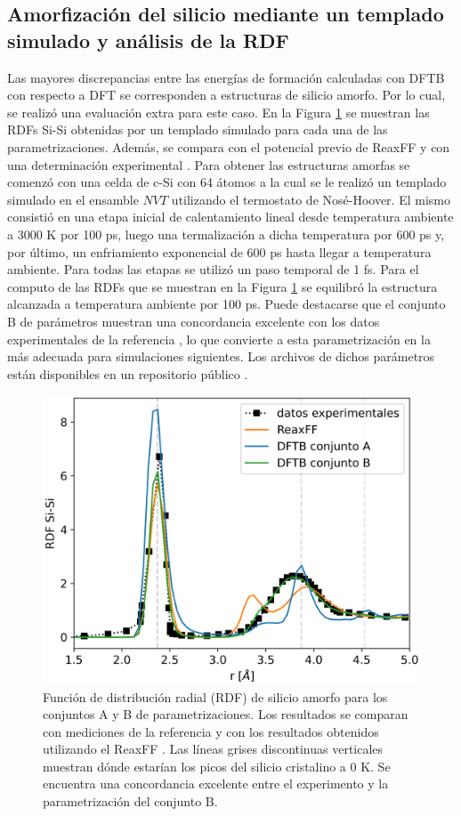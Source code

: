 \subsection{Amorfización del silicio mediante un templado simulado y análisis de la RDF}

Las mayores discrepancias entre las energías de formación calculadas con DFTB
con respecto a DFT se corresponden a estructuras de silicio amorfo. Por lo cual,
se realizó una evaluación extra para este caso. En la Figura \ref{fig:rdfb} se 
muestran las RDFs Si-Si obtenidas por un templado simulado para cada una de las
parametrizaciones. Además, se compara con el potencial previo de ReaxFF 
\cite{fan2013} y con una determinación experimental \cite{laaziri1999}. Para 
obtener las estructuras amorfas se comenzó con una celda de c-Si con 64 átomos 
a la cual se le realizó un templado simulado en el ensamble $NVT$ utilizando el 
termostato de Nosé-Hoover. El mismo consistió en una etapa inicial de 
calentamiento lineal desde temperatura ambiente a 3000 K por 100 ps, luego una
termalización a dicha temperatura por 600 ps y, por último, un enfriamiento 
exponencial de 600 ps hasta llegar a temperatura ambiente. Para todas las etapas
se utilizó un paso temporal de 1 fs. Para el computo de las RDFs que se muestran
en la Figura \ref{fig:rdfb} se equilibró la estructura alcanzada a temperatura 
ambiente por 100 ps. Puede destacarse que el conjunto B de parámetros muestran
una concordancia excelente con los datos experimentales de la referencia 
\cite{laaziri1999}, lo que convierte a esta parametrización en la más adecuada
para simulaciones siguientes. Los archivos de dichos parámetros están disponibles
en un repositorio público \cite{dftb_lisi}.

\begin{figure}[h!]
    \centering
    \includegraphics[width=.7\textwidth]{Silicio/modelo/resultados/rdf/rdf.png}
    \caption{Función de distribución radial (RDF) de silicio amorfo para los
    conjuntos A y B de parametrizaciones. Los resultados se comparan con 
    mediciones de la referencia \cite{laaziri1999} y con los resultados obtenidos
    utilizando el ReaxFF \cite{fan2013}. Las líneas grises discontinuas verticales
    muestran dónde estarían los picos del silicio cristalino a 0 K. Se encuentra 
    una concordancia excelente entre el experimento y la parametrización del 
    conjunto B.}
    \label{fig:rdfb}
\end{figure}
